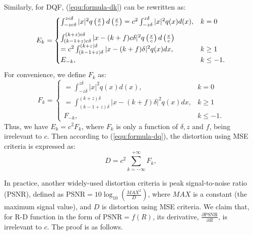 \documentclass[smallabstract,smallcaptions]{dccpaper}
\begin{document}
Similarly, for DQF, (\ref{equ:formula-dk}) can be rewritten as:  
\begin{equation}\label{equ:formula-dknew}
	E_k =
	\begin{cases}
		\int_{-z c\delta}^{z c\delta} |x|^2 q\left(\frac{x}{c}\right) d\left(\frac{x}{c}\right)
		= c^2\int_{-z \delta}^{z \delta} |x|^2 q(x) d(x),
		& k=0 \vspace{8pt} \\
		\int_{(k-1+z) c\delta}^{(k+z) c\delta} |x - (k+f) c\delta|^2 q\left(\frac{x}{c}\right) d\left(\frac{x}{c}\right)\\
		=c^2\int_{(k-1+z) \delta}^{(k+z) \delta} |x - (k+f) \delta|^2 q(x) dx,
		& k \ge 1 \\
		E_{-k},
		& k \le -1 .
	\end{cases}
\end{equation} 
For convenience, we define $F_k$ as:
\begin{equation}\label{equ:formula-fk}
	F_k =
	\begin{cases}
		= \int_{-z \delta}^{z \delta} |x|^2 q(x) d(x),
		& k=0 \\
		=\int_{(k-1+z) \delta}^{(k+z) \delta} |x - (k+f) \delta|^2 q(x) dx,
		& k \ge 1 \\
		F_{-k},
		& k \le -1 .
	\end{cases}
\end{equation}
Thus, we have $E_k = c^2 F_k$, where $F_k$ is only a function of $\delta, z$ and $f$, being irrelevant to $c$. Then according to (\ref{equ:formula-dq}), the distortion using MSE criteria is expressed as:
\begin{equation}\label{equ:formula-dqnew}
	D = c^2 \sum_{k=-\infty}^{+\infty} F_k, 
\end{equation}

In practice, another widely-used distortion criteria is peak signal-to-noise ratio (PSNR), defined as $\textrm{PSNR} = 10 \log_{10}\left(\frac{MAX^2}{D}\right)$, where $MAX$ is a constant (the maximum signal value), and $D$ is distortion using MSE criteria. We claim that, for R-D function in the form of $\textrm{PSNR}=f(R)$, its derivative, $\frac{\partial\textrm{PSNR}}{\partial R}$, is irrelevant to $c$. The proof is as follows.
\end{document}
